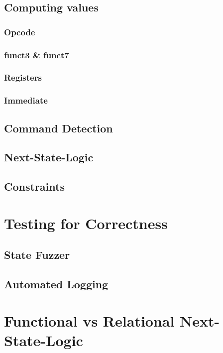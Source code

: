 \subsection{Computing values}
\subsubsection{Opcode}
\subsubsection{funct3 \& funct7}
\subsubsection{Registers}
\subsubsection{Immediate}
\subsection{Command Detection}
\subsection{Next-State-Logic}
\subsection{Constraints}
\section{Testing for Correctness}
\subsection{State Fuzzer}
\subsection{Automated Logging}
\section{Functional vs Relational Next-State-Logic}\label{sec:funcVSrel}